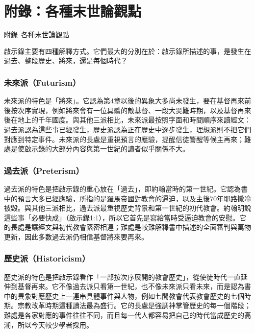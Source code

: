 

\renewcommand{\appendixname}{附錄}
\renewcommand{\thechapter}{\arabic{chapter}}
\renewcommand{\thefigure}{\appendixname~\thechapter.\arabic{figure}}  %

\chapter*{附錄：各種末世論觀點}
%
  {\appendixname~\thechapter\quad 各種末世論觀點}




啟示錄主要有四種解釋方式。它們最大的分別在於：啟示錄所描述的事，是發生在過去、整段歷史、將來，還是每個時代？

\subsection*{未來派（Futurism）}
未來派的特色是「將來」。它認為第4章以後的異象大多尚未發生，要在基督再來前後按次序實現，例如將來會有一位具體的敵基督、一段大災難時期，以及基督再來後在地上的千年國度。與其他三派相比，未來派最按照字面和時間順序來讀經文：過去派認為這些事已經發生，歷史派認為正在歷史中逐步發生，理想派則不把它們對應到特定事件。未來派的長處是重視預言的應驗，提醒信徒警醒等候主再來；難處是使啟示錄的大部分內容與第一世紀的讀者似乎關係不大。

\subsection*{過去派（Preterism）}
過去派的特色是把啟示錄的重心放在「過去」，即約翰當時的第一世紀。它認為書中的預言大多已經應驗，所指的是羅馬帝國對教會的逼迫，以及主後70年耶路撒冷被毀。與其他三派相比，過去派最重視歷史背景和第一世紀的初代教會。約翰明說這些事「必要快成」（啟示錄1:1），所以它首先是寫給當時受逼迫教會的安慰。它的長處是讓經文與初代教會緊密相連；難處是較難解釋書中描述的全面審判與萬物更新，因此多數過去派仍相信基督將來要再來。

\subsection*{歷史派（Historicism）}
歷史派的特色是把啟示錄看作「一部按次序展開的教會歷史」，從使徒時代一直延伸到基督再來。它不像過去派只看第一世紀，也不像未來派只看未來，而是認為書中的異象對應歷史上一連串具體事件與人物，例如七間教會代表教會歷史的七個時期。宗教改革時期這種讀法最為盛行。它的長處是強調神掌管歷史的每一個階段；難處是各家對應的事件往往不同，而且每一代人都容易把自己的時代當成歷史的高潮，所以今天較少學者採用。

